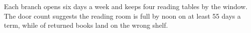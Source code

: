 Each branch opens six days a week and keeps four reading tables by the window.
The door count suggests the reading room is full by noon on at least 55 days a term, while  of returned books land on the wrong shelf.

